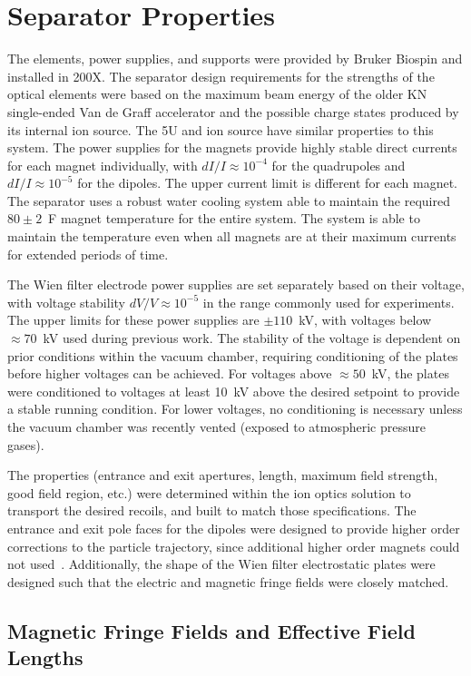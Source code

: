 \section{Separator Properties}

The elements, power supplies, and supports were provided by Bruker Biospin and
installed in 200X. The separator design requirements for the strengths of the
optical elements were based on the maximum beam energy of the older KN
single-ended Van de Graff accelerator and the possible charge states produced
by its internal ion source. The 5U and ion source have similar properties to
this system. The power supplies for the magnets provide highly stable direct
currents for each magnet individually, with $dI/I \approx 10^{-4}$ for the
quadrupoles and $dI/I \approx 10^{-5}$ for the dipoles. The upper current limit
is different for each magnet. The separator uses a robust
water cooling system able to maintain the required $80\pm2$~\degree{}F magnet
temperature for the entire system. The system is able to maintain the
temperature even when all magnets are at their maximum currents for extended
periods of time.

The Wien filter electrode power supplies are set separately based on their
voltage, with voltage stability $dV/V \approx 10^{-5}$ in the range commonly
used for experiments. The upper limits for these power supplies are
$\pm110$~kV, with voltages below $\approx 70$~kV used during previous work. The
stability of the voltage is dependent on prior conditions within the vacuum
chamber, requiring conditioning of the plates before higher voltages can be
achieved. For voltages above $\approx 50$~kV, the plates were conditioned to
voltages at least 10~kV above the desired setpoint to provide a stable running
condition. For lower voltages, no conditioning is necessary unless the vacuum
chamber was recently vented (exposed to atmospheric pressure gases).

The properties (entrance and exit apertures, length, maximum field strength,
good field region, etc.) were determined within the ion optics solution to
transport the desired recoils, and built to match those specifications. The
entrance and exit pole faces for the dipoles were designed to provide higher
order corrections to the particle trajectory, since additional higher order
magnets could not used~\cite{Couder2008}. Additionally, the shape of the
Wien filter electrostatic plates were designed such that the electric and
magnetic fringe fields were closely matched.


\subsection{Magnetic Fringe Fields and Effective Field Lengths}

